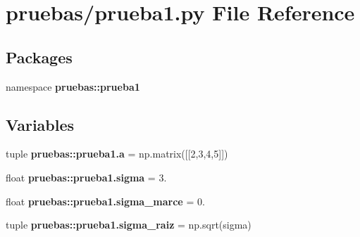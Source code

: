 \section{pruebas/prueba1.py \-File \-Reference}
\label{prueba1_8py}
\subsection*{\-Packages}
\begin{DoxyCompactItemize}
\item 
namespace {\bf pruebas\-::prueba1}
\end{DoxyCompactItemize}
\subsection*{\-Variables}
\begin{DoxyCompactItemize}
\item 
tuple {\bf pruebas\-::prueba1.\-a} = np.\-matrix([[2,3,4,5]])
\item 
float {\bf pruebas\-::prueba1.\-sigma} = 3.
\item 
float {\bf pruebas\-::prueba1.\-sigma\-\_\-marce} = 0.
\item 
tuple {\bf pruebas\-::prueba1.\-sigma\-\_\-raiz} = np.\-sqrt(sigma)
\end{DoxyCompactItemize}
